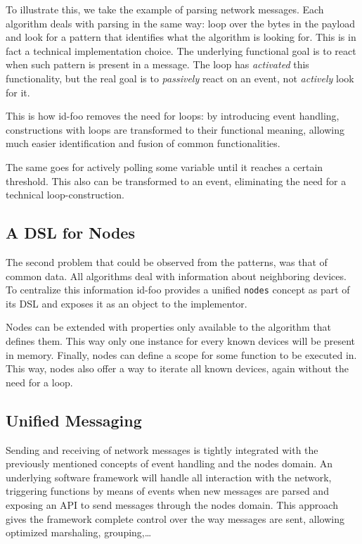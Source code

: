 \documentclass[conference]{IEEEtran}
\newcommand{\NAME}{id-foo\xspace}
\begin{document}
To illustrate this, we take the example of parsing network messages. Each
algorithm deals with parsing in the same way: loop over the bytes in the
payload and look for a pattern that identifies what the algorithm is looking
for. This is in fact a technical implementation choice. The underlying
functional goal is to react when such pattern is present in a message. The loop
has \emph{activated} this functionality, but the real goal is to
\emph{passively} react on an event, not \emph{actively} look for it.

This is how \NAME removes the need for loops: by introducing event handling,
constructions with loops are transformed to their functional meaning, allowing
much easier identification and fusion of common functionalities.

The same goes for actively polling some variable until it reaches a certain
threshold. This also can be transformed to an event, eliminating the need for a
technical loop-construction.

\subsection{A DSL for Nodes}

The second problem that could be observed from the patterns, was that of common
data. All algorithms deal with information about neighboring devices. To
centralize this information \NAME provides a unified \texttt{nodes} concept as
part of its DSL and exposes it as an object to the implementor.

Nodes can be extended with properties only available to the algorithm that
defines them. This way only one instance for every known devices will be
present in memory. Finally, nodes can define a scope for some function to be
executed in. This way, nodes also offer a way to iterate all known devices,
again without the need for a loop.

\subsection{Unified Messaging}

Sending and receiving of network messages is tightly integrated with the
previously mentioned concepts of event handling and the nodes domain. An
underlying software framework will handle all interaction with the network,
triggering functions by means of events when new messages are parsed and
exposing an API to send messages through the nodes domain. This approach gives
the framework complete control over the way messages are sent, allowing
optimized marshaling, grouping,\dots
\end{document}
